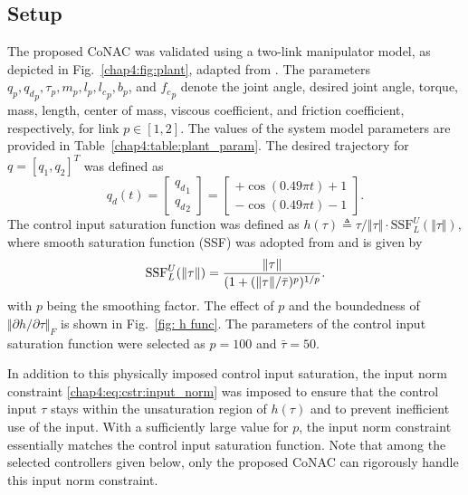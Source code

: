 \subsection{Setup}

The proposed CoNAC was validated using a two-link manipulator model, as depicted in Fig.~\ref{chap4:fig:plant}, adapted from \cite{RN33}. 
The parameters $q_p,{q_d}_p,\tau_p,m_p,l_p,{l_c}_p,b_p$, and ${f_c}_p$ denote the joint angle, desired joint angle, torque, mass, length, center of mass, viscous coefficient, and friction coefficient, respectively, for link $p\in[1,2]$.
The values of the system model parameters are provided in Table~\ref{chap4:table:plant_param}. The desired trajectory for ${q}=[q_1,q_2]^T$ was defined as
\begin{equation}
    {q_d}(t) = 
    \begin{bmatrix}
        {q_d}_1\\{q_d}_2
    \end{bmatrix}
    =
    \begin{bmatrix}
        +\cos(0.49\pi t) + 1 \\
        -\cos(0.49\pi t) - 1 
    \end{bmatrix}.
\end{equation}
The control input saturation function was defined as $h(\tau)\triangleq \tau/\Vert\tau\Vert \cdot \text{SSF}_L^U(\Vert\tau\Vert)$, where smooth saturation function (SSF) was adopted from \cite{RN72} and is given by
\begin{equation}
    \text{SSF}_L^U(\Vert\tau\Vert) = {\Vert\tau\Vert\over (1+(\Vert\tau\Vert/\bar\tau)^p)^{1/p}}.
    \label{chap4:eq:sat_h}
\end{equation}
with $p$ being the smoothing factor. The effect of $p$ and the boundedness of $\Vert\partial h/\partial \tau\Vert_F$ is shown in Fig.~\ref{fig: h func}.
The parameters of the control input saturation function were selected as $p=100$ and $\bar\tau=50$. 

In addition to this physically imposed control input saturation, the input norm constraint \eqref{chap4:eq:cstr:input_norm} was imposed to ensure that the control input $\tau$ stays within the unsaturation region of $h(\tau)$ and to prevent inefficient use of the input. With a sufficiently large value for $p$, the input norm constraint essentially matches the control input saturation function. Note that among the selected controllers given below, only the proposed CoNAC can rigorously handle this input norm constraint.


